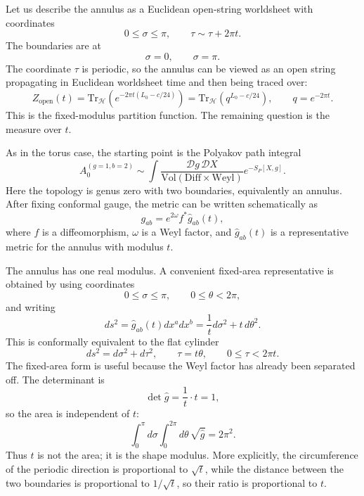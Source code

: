 \documentclass[
  10pt,
  a4paper,
  openany]{book}
\begin{document}
Let us describe the annulus as a Euclidean open-string worldsheet with
coordinates \[
0\leq \sigma\leq \pi,
\qquad
\tau\sim \tau+2\pi t.
\] The boundaries are at \[
\sigma=0,\qquad \sigma=\pi.
\] The coordinate \(\tau\) is periodic, so the annulus can be viewed as
an open string propagating in Euclidean worldsheet time and then being
traced over: \[
Z_{\mathrm{open}}(t)
=
\mathrm{Tr}_{\mathcal H}
\left(e^{-2\pi t(L_0-c/24)}\right)
=
\mathrm{Tr}_{\mathcal H}
\left(q^{L_0-c/24}\right),
\qquad
q=e^{-2\pi t}.
\] This is the fixed-modulus partition function. The remaining question
is the measure over \(t\).

As in the torus case, the starting point is the Polyakov path integral
\[
A_0^{(g=1,b=2)}
\sim
\int
\frac{\mathcal D g\,\mathcal D X}
{\mathrm{Vol}(\mathrm{Diff}\times\mathrm{Weyl})}
e^{-S_P[X,g]}.
\] Here the topology is genus zero with two boundaries, equivalently an
annulus. After fixing conformal gauge, the metric can be written
schematically as \[
g_{ab}
=
e^{2\omega}
f^*\hat g_{ab}(t),
\] where \(f\) is a diffeomorphism, \(\omega\) is a Weyl factor, and
\(\hat g_{ab}(t)\) is a representative metric for the annulus with
modulus \(t\).

The annulus has one real modulus. A convenient fixed-area representative
is obtained by using coordinates \[
0\leq \sigma\leq \pi,
\qquad
0\leq \theta<2\pi,
\] and writing \[
ds^2
=
\hat g_{ab}(t)dx^a dx^b
=
\frac{1}{t}d\sigma^2+t\,d\theta^2.
\] This is conformally equivalent to the flat cylinder \[
ds^2=d\sigma^2+d\tau^2,
\qquad
\tau=t\theta,
\qquad
0\leq \tau<2\pi t.
\] The fixed-area form is useful because the Weyl factor has already
been separated off. The determinant is \[
\det \hat g
=
\frac{1}{t}\cdot t
=1,
\] so the area is independent of \(t\): \[
\int_0^\pi d\sigma\int_0^{2\pi}d\theta\,\sqrt{\hat g}
=
2\pi^2.
\] Thus \(t\) is not the area; it is the shape modulus. More explicitly,
the circumference of the periodic direction is proportional to
\(\sqrt t\), while the distance between the two boundaries is
proportional to \(1/\sqrt t\), so their ratio is proportional to \(t\).
\end{document}
